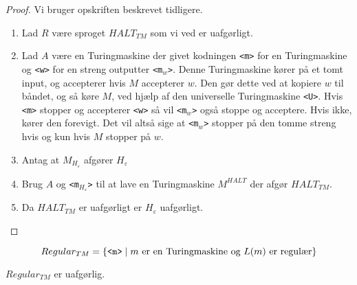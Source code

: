 \begin{proof}
	Vi bruger opskriften beskrevet tidligere.
	\begin{enumerate}
		\item Lad $R$ være sproget $HALT_{TM}$ som vi ved er uafgørligt.
		\item Lad $A$ være en Turingmaskine der givet kodningen \texttt{<m>} for en Turingmaskine og \texttt{<w>} for en streng outputter \texttt{<m$_{w}$>}. Denne Turingmaskine kører på et tomt input, og accepterer hvis $M$ accepterer $w$. Den gør dette ved at kopiere $w$ til båndet, og så køre $M$, ved hjælp af den universelle Turingmaskine \texttt{<U>}. Hvis \texttt{<m>} stopper og accepterer \texttt{<w>} så vil \texttt{<m$_{w}$>} også stoppe og acceptere. Hvis ikke, kører den forevigt. Det vil altså sige at \texttt{<m$_{w}$>} stopper på den tomme streng hvis og kun hvis $M$ stopper på $w$.
		\item Antag at $M_{H_{\varepsilon}}$ afgører $H_{\varepsilon}$
		\item Brug $A$ og \texttt{<m$_{H_{\varepsilon}}$>} til at lave en Turingmaskine $M^{HALT}$ der afgør $HALT_{TM}$.
		\item Da $HALT_{TM}$ er uafgørligt er $H_{\varepsilon}$ uafgørligt.
	\end{enumerate}

\end{proof}

\begin{equation*}
	Regular_{TM} = \{\text{\texttt{<m>}} \mid m \text{ er en Turingmaskine og }L(m) \text{ er regulær}\}
\end{equation*}

\begin{theorem}
	$Regular_{TM}$ er uafgørlig.
\end{theorem}

